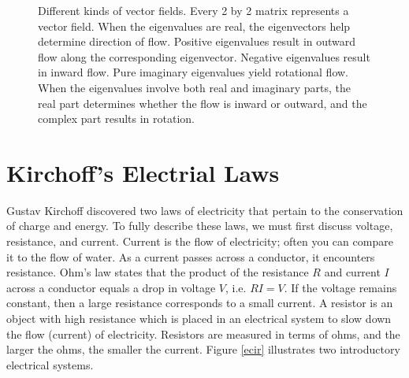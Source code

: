 \begin{figure}
\begin{tikzpicture}[inner sep=0mm]
\end{tikzpicture}
\caption{\label{vflots}
Different kinds of vector fields.  Every 2 by 2 matrix represents a vector field.  When the eigenvalues are real, the eigenvectors help determine direction of flow. Positive eigenvalues result in outward flow along the corresponding eigenvector. Negative eigenvalues result in inward flow. Pure imaginary eigenvalues yield rotational flow. When the eigenvalues involve both real and imaginary parts, the real part determines whether the flow is inward or outward, and the complex part results in rotation.
}
\end{figure}












\section{Kirchoff's Electrial Laws}
Gustav Kirchoff discovered two laws of electricity that pertain to the conservation of charge and energy. 
To fully describe these laws, we must first discuss voltage, resistance, and current.  
Current is the flow of electricity; often you can compare it to the flow of water.  As a current passes across a conductor, it encounters resistance. 
Ohm's law states that the product of the resistance $R$ and current $I$ across a conductor equals a drop in voltage $V$, i.e. $RI=V$. 
If the voltage remains constant, then a large resistance corresponds to a small current. 
A resistor is an object with high resistance which is placed in an electrical system to slow down the flow (current) of electricity. 
Resistors are measured in terms of ohms, and the larger the ohms, the smaller the current.  Figure \ref{ecir} illustrates two introductory electrical systems. 



